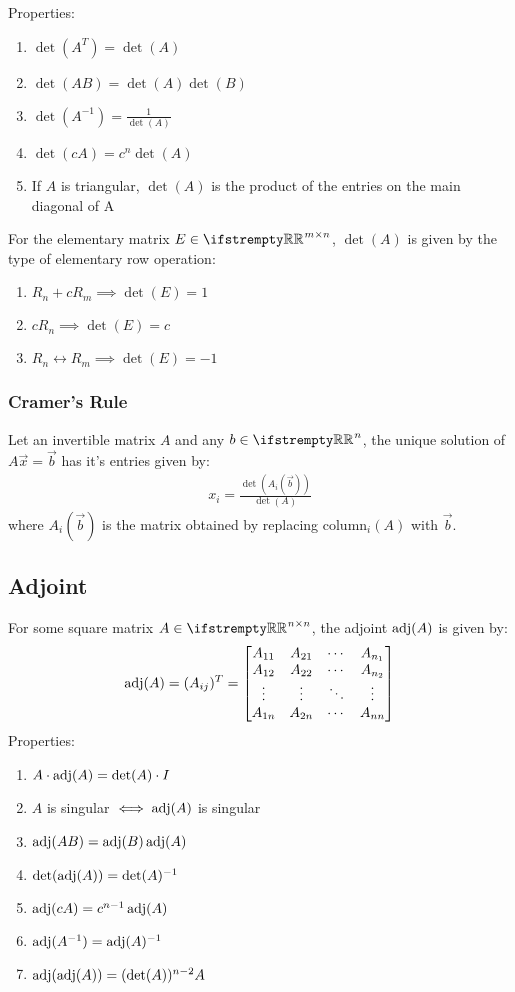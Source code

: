 \documentclass[12pt, a4paper]{article}
\begin{document}
\begin{multicols*}{3}
Properties:
\begin{enumerate}[\roman*.]
  \item $\det(A^T) = \det(A)$
  \item $\det(AB) = \det(A)\det(B)$
  \item $\det(A^{-1}) = \frac{1}{\det(A)}$
  \item $\det(cA) = c^n\det(A)$ 
  \item If $A$ is triangular, $\det(A)$ is the product of the entries on the main diagonal of A
\end{enumerate}

For the elementary matrix $E \in \RR^{m{\times}n}$, $\det(A)$ is given by the type of elementary row operation:
\begin{enumerate}[\roman*.]
  \item $ R_n + cR_m\implies \det(E) = 1$
  \item $cR_n \implies \det(E) = c$
  \item $R_n \leftrightarrow R_m \implies \det(E) = -1$
\end{enumerate}

\subsubsection{Cramer's Rule}
Let an invertible matrix $A$ and any $b \in \RR^n$, the unique solution of $A\vec{x} = \vec{b}$ has it's entries given by:
\begin{align*}
  x_i = \frac{\det(A_i(\vec{b}))}{\det(A)}
\end{align*}
where $A_i(\vec{b})$ is the matrix obtained by replacing column$_i(A)$ with $\vec{b}$.

\colbreak

\subsection{Adjoint}
For some square matrix $A \in \RR^{n{\times}n}$, the adjoint $\operatorname{adj}(A)$ is given by:
\begin{gather*}
  \operatorname{adj}(A) = (A_{ij})^T = 
  \begin{bmatrix}
    A_{11} & A_{21} & \cdots & A_{n_1} \\
    A_{12} & A_{22} & \cdots & A_{n_2} \\
    \vdots & \vdots & \ddots & \vdots \\
    A_{1n} & A_{2n} & \cdots & A_{nn}
  \end{bmatrix}  
\end{gather*}
Properties:
\begin{enumerate}[\roman*.]
  \item $A\cdot\operatorname{adj}(A) = \det(A)\cdot I$
  \item $A$ is singular $\iff \operatorname{adj}(A)$ is singular
  \item $\operatorname{adj}(AB) = \operatorname{adj}(B)\operatorname{adj}(A)$
  \item $\det(\operatorname{adj}(A)) = \det(A)^{-1}$
  \item $\operatorname{adj}(cA) = c^{n-1}\operatorname{adj}(A)$
  \item $\operatorname{adj}(A^{-1}) = \operatorname{adj}(A)^{-1}$
  \item $\operatorname{adj}(\operatorname{adj}(A)) =  (\det(A))^{n-2}A$
\end{enumerate}


\end{multicols*}
\end{document}
